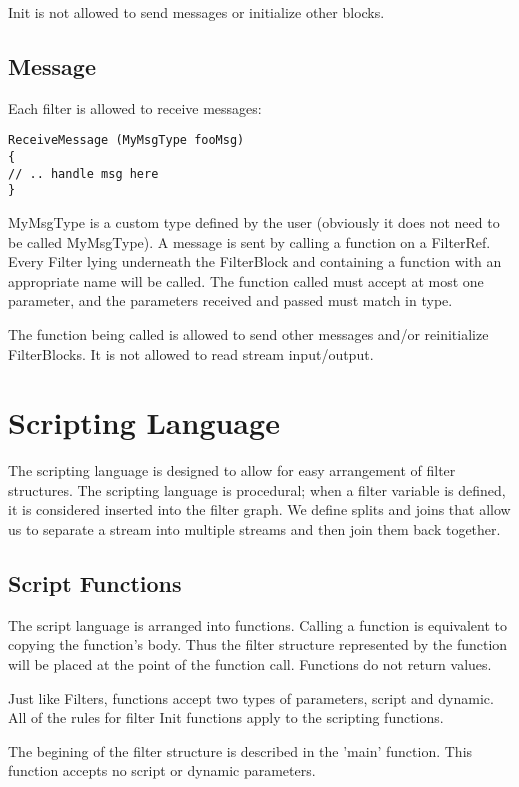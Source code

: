 \documentclass[twocolumn, draft]{article}
\begin{document}
Init is not allowed to send messages or initialize other blocks.

\subsection{Message}

Each filter is allowed to receive messages:

\begin{verbatim}
ReceiveMessage (MyMsgType fooMsg)
{
// .. handle msg here
}
\end{verbatim}

MyMsgType is a custom type defined by the user (obviously it does not need
to be called MyMsgType).  A message is sent by calling a function on a
FilterRef.  Every Filter lying underneath the FilterBlock and containing
a function with an appropriate name will be called.  The function called
must accept at most one parameter, and the parameters received and passed
must match in type.

The function being called is allowed to send other messages and/or reinitialize
FilterBlocks.  It is not allowed to read stream input/output.

\section{Scripting Language}

The scripting language is designed to allow for easy arrangement of 
filter structures.  The scripting language is procedural;  when a filter
variable is defined, it is considered inserted into the filter graph.
We define splits and joins that allow us to separate a stream into multiple
streams and then join them back together.

\subsection{Script Functions}

The script language is arranged into functions.  Calling a function is
equivalent to copying the function's body.  Thus the filter structure 
represented by the function will be placed at the point of the function
call.  Functions do not return values.

Just like Filters, functions accept two types of parameters, script
and dynamic.  All of the rules for filter Init functions apply to the
scripting functions.

The begining of the filter structure is described in the 'main' function.
This function accepts no script or dynamic parameters.
\end{document}
